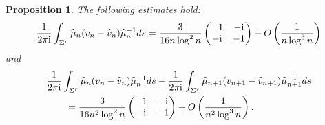\documentclass[11pt]{article}
\numberwithin{equation}{section}
\newcommand{\hmu}{{\widehat \mu}}
\newcommand{\bv}{v}
\newcommand{\hv}{{\widehat v}}
\newcommand{\Sigr}{\Sigma^r}
\newcommand{\I}{\mathrm{i}}
\newtheorem{Proposition}[Theorem]{Proposition}
 { \theoremstyle{definition}
\newtheorem{Definition}[Theorem]{Definition}
\newtheorem{Note}[Theorem]{Note}
\newtheorem{Example}[Theorem]{Example}
\newtheorem{Remark}[Theorem]{Remark} }
\numberwithin{equation}{section}
\begin{document}
\begin{Proposition}\label{IntegralEst2Ap}
The following estimates hold:
\begin{align}\label{Int}
\frac{1}{2\pi\I} \int_{\Sigr} \hmu_n(\bv_n-\hv_n)\hmu_n^{-1} {\rm d}s = \frac{3}{16n \log^2n} \begin{pmatrix}
\phantom{-}1 & -\I\\
-\I & -1
\end{pmatrix} + O\left(\frac{1}{n\log^3 n}\right)
\end{align}
and
\begin{align}\nonumber
 & \frac{1}{2\pi\I} \int_{\Sigr} \hmu_n(\bv_n-\hv_n)\hmu_n^{-1} {\rm d}s - \frac{1}{2\pi\I} \int_{\Sigr} \hmu_{n+1}(\bv_{n+1}-\hv_{n+1})\hmu^{-1}_{n+1} {\rm d}s
 \\\label{differenceInt}
 &\qquad= \frac{3}{16n^2 \log^2n} \begin{pmatrix}
\phantom{-}1 & -\I\\
-\I & -1
\end{pmatrix} + O\left(\frac{1}{n^2\log^3 n}\right).
\end{align}
\end{Proposition}
\end{document}
